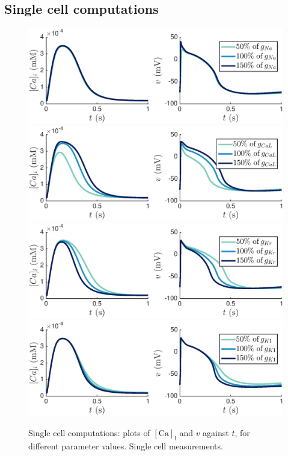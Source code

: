 \documentclass{article}
\begin{document}
\subsection{Single cell computations} \label{Single cell computations}
%
\begin{figure}
   \includegraphics[trim=0cm 0cm 0cm 0cm, clip=true, width=1\linewidth]{sc_gna} 
   \includegraphics[trim=0cm 0cm 0cm 0cm, clip=true, width=1\linewidth]{sc_gcal} 
      \includegraphics[trim=0cm 0cm 0cm 0cm, clip=true, width=1\linewidth]{sc_gkr} 
         \includegraphics[trim=0cm 0cm 0cm 0cm, clip=true, width=1\linewidth]{sc_gk1} 
    \caption{Single cell computations: plots of $[\mathrm{Ca}]_{\mathrm{i}}$ and $v$  against $t$, for different parameter values. Single cell measurements.}
    \label{fig:4a}
\end{figure}
\end{document}
